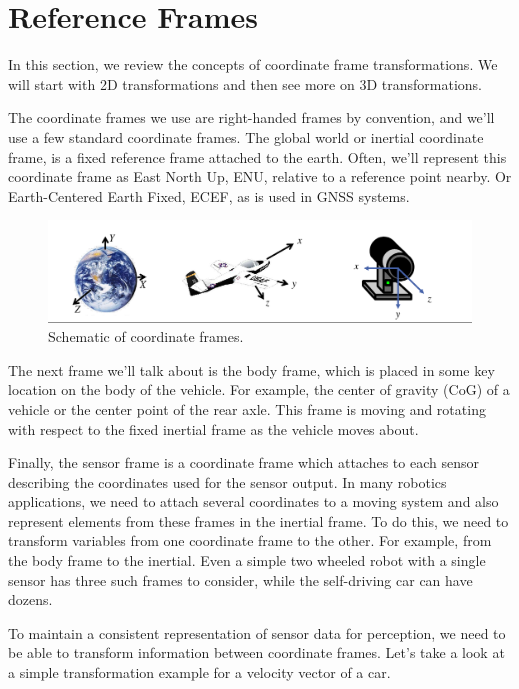 \section{Reference Frames}
\label{reference_frames}

In this section, we review the concepts of coordinate frame transformations. 
We will start with 2D transformations and then see more on 3D transformations. 

The coordinate frames we use are right-handed frames by convention, and we'll use a few standard coordinate frames.
The global world or inertial coordinate frame, is a fixed reference frame attached to the earth. Often, we'll represent this coordinate frame as East North Up, ENU, relative to a reference point nearby. Or Earth-Centered Earth Fixed, ECEF, as is used in GNSS systems.

\begin{figure}[!htb]
\begin{center}
\includegraphics[scale=0.290]{img/coordinate_transforms/coordinate_framew.jpeg}
\end{center}
\caption{Schematic of coordinate frames.}
\label{coordinate_framew}
\end{figure}


The next frame we'll talk about is the body frame, which is placed in some key location on the body of the vehicle. For example, the center of gravity (CoG) of a vehicle or the center point of the rear axle. This frame is moving and rotating with respect to the fixed inertial frame as the vehicle moves about.

Finally, the sensor frame is a coordinate frame which attaches to each sensor describing the coordinates used for the sensor output. In many robotics applications, we need to attach several coordinates to a moving system and also represent elements from these frames in the inertial frame. To do this, we need to transform variables from one coordinate frame to the other. For example, from the body frame to the inertial. Even a simple two wheeled robot with a single sensor has three such frames to consider, while the self-driving car can have dozens.

To maintain a consistent representation of sensor data for perception, we need to be able to transform information between coordinate frames. 
Let's take a look at a simple transformation example for a velocity vector of a car.

